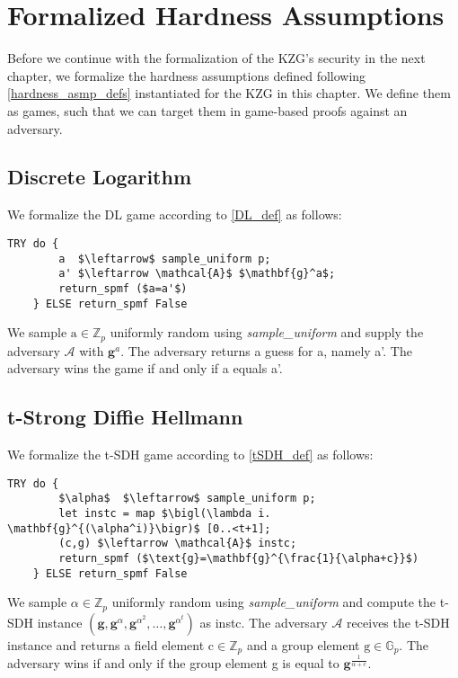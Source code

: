 \chapter{Formalized Hardness Assumptions}\label{chapter:hardness_asmps_frml}
Before we continue with the formalization of the KZG's security in the next chapter, we formalize the hardness assumptions defined following \ref{hardness_asmp_defs} instantiated for the KZG in this chapter. We define them as games, such that we can target them in game-based proofs against an adversary.

\section{Discrete Logarithm}
We formalize the DL game according to \ref{DL_def} as follows: 
\begin{lstlisting}[language=isabelle]
    TRY do {
        a  $\leftarrow$ sample_uniform p;
        a' $\leftarrow \mathcal{A}$ $\mathbf{g}^a$;
        return_spmf ($a=a'$)
    } ELSE return_spmf False
\end{lstlisting}
We sample $\text{a} \in \mathbb{Z}_p$ uniformly random using \textit{sample\_uniform} and supply the adversary $\mathcal{A}$ with $\mathbf{g}^a$. The adversary returns a guess for a, namely a'. The adversary wins the game if and only if a equals a'.

\section{t-Strong Diffie Hellmann}
We formalize the t-SDH game according to \ref{tSDH_def} as follows: 
\begin{lstlisting}[language=isabelle]
    TRY do {
        $\alpha$  $\leftarrow$ sample_uniform p;
        let instc = map $\bigl(\lambda i. \mathbf{g}^{(\alpha^i)}\bigr)$ [0..<t+1];
        (c,g) $\leftarrow \mathcal{A}$ instc;
        return_spmf ($\text{g}=\mathbf{g}^{\frac{1}{\alpha+c}}$)
    } ELSE return_spmf False
\end{lstlisting}
We sample $\alpha\in\mathbb{Z}_p$ uniformly random using \textit{sample\_uniform} and compute the t-SDH instance $(\mathbf{g}, \mathbf{g}^{\alpha}, \mathbf{g}^{\alpha^2}, \dots, \mathbf{g}^{\alpha^t})$ as instc. The adversary $\mathcal{A}$ receives the t-SDH instance and returns a field element $\text{c}\in\mathbb{Z}_p$ and a group element $\text{g}\in\mathbb{G}_p$. The adversary wins if and only if the group element g is equal to $\mathbf{g}^{\frac{1}{\alpha+c}}$.

